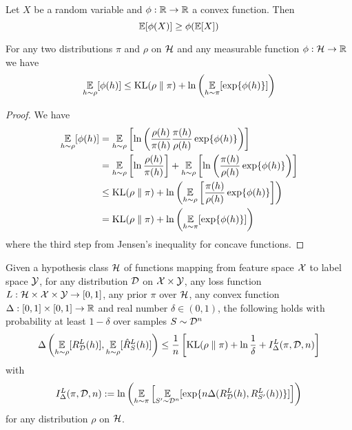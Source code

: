 \begin{lemma}
  Let $X$ be a random variable and $\phi : \mathbb{R} \to \mathbb{R}$ a convex function. Then
  \begin{equation}
    \operatorname*{\mathbb{E}}[\phi(X)] \geq \phi(\operatorname*{\mathbb{E}}[X])
  \end{equation}
\end{lemma}

\begin{lemma}
  For any two distributions $\pi$ and $\rho$ on $\mathcal{H}$ and any measurable
  function $\phi : \mathcal{H} \to \mathbb{R}$ we have
  \begin{equation}
    \operatorname*{\mathbb{E}}_{h \sim \rho}[\phi(h)] \leq \text{KL}(\rho \parallel \pi) + \ln\left(\operatorname*{\mathbb{E}}_{h \sim
    \pi}[\exp\{\phi(h)\}]\right)
  \end{equation}
\end{lemma}

\begin{proof}
  We have
  \begin{equation}
    \begin{split}
      \operatorname*{\mathbb{E}}_{h \sim \rho}[\phi(h)]
      &= \operatorname*{\mathbb{E}}_{h \sim \rho}\left[\ln\left(\frac{\rho(h)}{\pi(h)}
      \frac{\pi(h)}{\rho(h)} \exp\{\phi(h)\}\right)\right] \\
      &= \operatorname*{\mathbb{E}}_{h \sim \rho}\left[\ln\frac{\rho(h)}{\pi(h)}\right] + \operatorname*{\mathbb{E}}_{h \sim
      \rho}\left[\ln\left(\frac{\pi(h)}{\rho(h)} \exp\{\phi(h)\}\right)\right]
      \\
      &\leq \text{KL}(\rho \parallel \pi) + \ln\left(\operatorname*{\mathbb{E}}_{h \sim
      \rho}\left[\frac{\pi(h)}{\rho(h)} \exp\{\phi(h)\}\right]\right) \\
      &= \text{KL}(\rho \parallel \pi) + \ln\left(\operatorname*{\mathbb{E}}_{h \sim \pi}[\exp\{\phi(h)\}]\right)
    \end{split}
  \end{equation}
  where the third step from Jensen's inequality for concave functions.
\end{proof}

\begin{theorem}
  \label{thm:pac-bayes}
  Given a hypothesis class $\mathcal{H}$ of functions mapping from feature space $\mathcal{X}$
  to label space $\mathcal{Y}$, for any distribution $\mathcal{D}$ on $\mathcal{X} \times \mathcal{Y}$, any loss
  function $L : \mathcal{H} \times \mathcal{X} \times \mathcal{Y} \to [0, 1]$, any prior $\pi$ over
  $\mathcal{H}$, any convex function $\Delta : [0, 1] \times [0, 1] \to \mathbb{R}$ and real
  number $\delta \in (0, 1)$, the following holds with probability at least $1 -
  \delta$ over samples $S \sim \mathcal{D}^n$
  \begin{equation}
    \label{eq:pac-bayes-bound}
    \Delta\left(\operatorname*{\mathbb{E}}_{h \sim \rho}[R_{\mathcal{D}}^L(h)], \operatorname*{\mathbb{E}}_{h \sim
    \rho}[\hat{R}_S^L(h)]\right) \leq \frac{1}{n} \left[\text{KL}(\rho \parallel \pi) +
    \ln \frac{1}{\delta} + I_\Delta^L(\pi, \mathcal{D}, n)\right]
  \end{equation}
  with
  \begin{equation}
    I_\Delta^L(\pi, \mathcal{D}, n) := \ln\left(\operatorname*{\mathbb{E}}_{h \sim \pi}\left[\operatorname*{\mathbb{E}}_{S' \sim
    \mathcal{D}^n}[\exp\{n \Delta(R_{\mathcal{D}}^L(h), R_{S'}^L(h))\}]\right]\right)
  \end{equation}
  for any distribution $\rho$ on $\mathcal{H}$.
\end{theorem}

